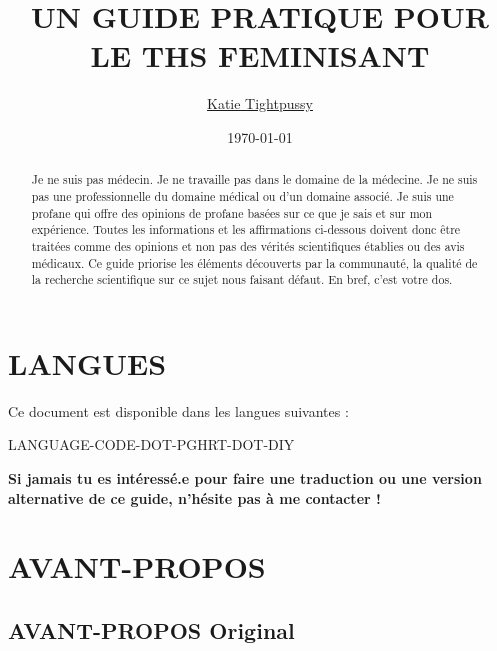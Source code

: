 \documentclass{article}
\title{UN GUIDE PRATIQUE POUR LE THS FEMINISANT}
\author{\href{https://katea.gay/}{Katie Tightpussy}}
\date{\today}
\begin{document}
\maketitle
\tableofcontents
\begin{abstract}
  Je ne suis pas médecin. Je ne travaille pas dans le domaine de la médecine. Je ne suis pas une professionnelle du domaine médical ou d'un domaine associé. Je suis une profane qui offre des opinions de profane basées sur ce que je sais et sur mon expérience. Toutes les informations et les affirmations ci-dessous doivent donc être traitées comme des opinions et non pas des vérités scientifiques établies ou des avis médicaux. Ce guide priorise les éléments découverts par la communauté, la qualité de la recherche scientifique sur ce sujet nous faisant défaut. En bref, c'est votre dos.
\end{abstract}

\section*{LANGUES}

Ce document est disponible dans les langues suivantes : 

LANGUAGE-CODE-DOT-PGHRT-DOT-DIY

\noindent\textbf{Si jamais tu es intéressé.e pour faire une traduction ou une version alternative de ce guide, n'hésite pas à me contacter !}



\section{AVANT-PROPOS}

\subsection{AVANT-PROPOS Original}
\end{document}
